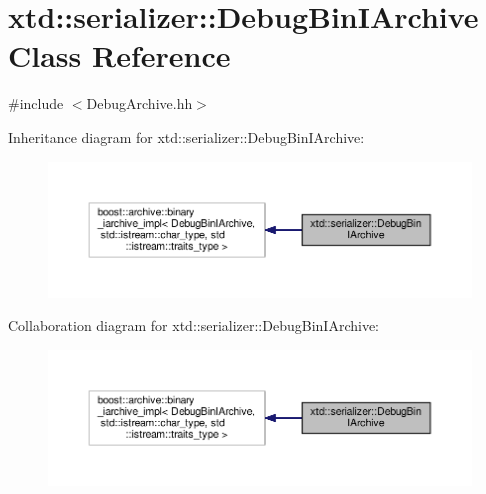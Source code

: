\hypertarget{classxtd_1_1serializer_1_1DebugBinIArchive}{\section{xtd\-:\-:serializer\-:\-:Debug\-Bin\-I\-Archive Class Reference}
\label{classxtd_1_1serializer_1_1DebugBinIArchive}
}


{\ttfamily \#include $<$Debug\-Archive.\-hh$>$}



Inheritance diagram for xtd\-:\-:serializer\-:\-:Debug\-Bin\-I\-Archive\-:
\nopagebreak
\begin{figure}[H]
\begin{center}
\leavevmode
\includegraphics[width=350pt]{classxtd_1_1serializer_1_1DebugBinIArchive__inherit__graph}
\end{center}
\end{figure}


Collaboration diagram for xtd\-:\-:serializer\-:\-:Debug\-Bin\-I\-Archive\-:
\nopagebreak
\begin{figure}[H]
\begin{center}
\leavevmode
\includegraphics[width=350pt]{classxtd_1_1serializer_1_1DebugBinIArchive__coll__graph}
\end{center}
\end{figure}
